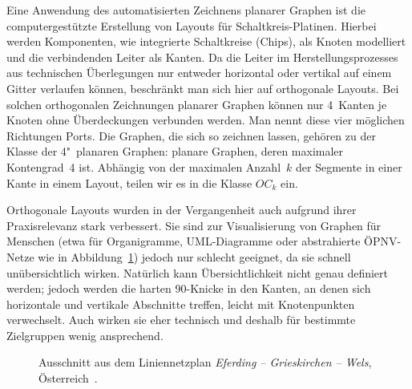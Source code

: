 \documentclass[a4paper]{scrreprt}
\theoremstyle{definition}
\begin{document}
Eine Anwendung des automatisierten Zeichnens planarer Graphen ist die computergestützte Erstellung von Layouts für Schaltkreis-Platinen. Hierbei werden Komponenten, wie integrierte Schaltkreise (Chips), als Knoten modelliert und die verbindenden Leiter als Kanten. Da die Leiter im Herstellungsprozesses  aus technischen Überlegungen nur entweder horizontal oder vertikal auf einem Gitter verlaufen können, beschränkt man sich hier auf orthogonale Layouts. Bei solchen orthogonalen Zeichnungen planarer Graphen können nur 4~Kanten je Knoten ohne Überdeckungen verbunden werden. Man nennt diese vier möglichen Richtungen Ports. Die Graphen, die sich so zeichnen lassen, gehören zu der Klasse der 4"~planaren Graphen: planare Graphen, deren maximaler Kontengrad~4 ist. Abhängig von der maximalen Anzahl~$k$ der Segmente in einer Kante in einem Layout, teilen wir es in die Klasse $OC_k$ ein.

Orthogonale Layouts wurden in der Vergangenheit auch aufgrund ihrer Praxisrelevanz stark verbessert. Sie sind zur Visualisierung von Graphen für Menschen (etwa für Organigramme, UML-Diagramme oder abstrahierte ÖPNV-Netze wie in Abbildung~\ref{fig:liniennetzplan}) jedoch nur schlecht geeignet, da sie schnell unübersichtlich wirken. %
Natürlich kann Übersichtlichkeit nicht genau definiert werden; jedoch werden die harten 90\textdegree-Knicke in den Kanten, an denen sich horizontale und vertikale Abschnitte treffen, leicht mit Knotenpunkten verwechselt. Auch wirken sie eher technisch und deshalb für bestimmte Zielgruppen wenig ansprechend.

\begin{figure}[h]
  \centering
  \caption{Ausschnitt aus dem Liniennetzplan \emph{Eferding -- Grieskirchen -- Wels}, Österreich~\cite{waldherr-14}.}
  \label{fig:liniennetzplan}
\end{figure}
\end{document}
